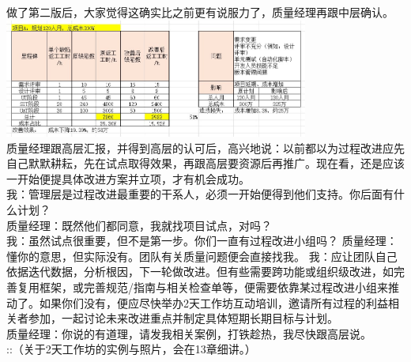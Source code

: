做了第二版后，大家觉得这确实比之前更有说服力了，质量经理再跟中层确认。\\

\includegraphics[width=10cm]{!!JiangJingFinal2presentScreenshot_2022-09-12_092535.jpg}\\

质量经理跟高层汇报，并得到高层的认可后，高兴地说：以前都以为过程改进应先自己默默耕耘，先在试点取得效果，再跟高层要资源后再推广。现在看，还是应该一开始便提具体改进方案并立项，才有机会成功。\\
我：管理层是过程改进最重要的干系人，必须一开始便得到他们支持。你后面有什么计划？\\
质量经理：既然他们都同意，我就找项目试点，对吗？\\
我：虽然试点很重要，但不是第一步。你们一直有过程改进小组吗？
质量经理：懂你的意思，但实际没有。团队有关质量问题便会直接找我。
我：应让团队自己依据迭代数据，分析根因，下一轮做改进。但有些需要跨功能或组织级改进，如完善复用框架，或完善规范/指南与相关检查单等，便需要依靠某过程改进小组来推动了。如果你们没有，便应尽快举办2天工作坊互动培训，邀请所有过程的利益相关者参加，一起讨论未来改进重点并制定具体短期长期目标与计划。\\
质量经理：你说的有道理，请发我相关案例，打铁趁热，我尽快跟高层说。\\
::（关于2天工作坊的实例与照片，会在13章细讲。）

